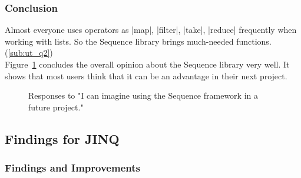 \subsubsection{Conclusion} %
\label{subsub:usertesting_conlusion}
Almost everyone uses operators as |map|, |filter|, |take|, |reduce|
frequently when working with lists. So the Sequence library brings much-needed
functions. (\ref{sub:ut_q2}) \\ 
Figure~\ref{fig:usertest_q1} concludes the overall opinion about the Sequence
library very well. It shows that most users think that it can be an
advantage in their next project.
\begin{figure}[H]
  \centering
{}
\caption{Responses to "I can imagine using the Sequence framework in a future project."}
\label{fig:usertest_q1}
\end{figure}
\subsection{Findings for JINQ} %
\label{sub:Findings for JINQ}
\subsubsection{Findings and Improvements} %
\label{subsub:jinq_finding_and_imrpovements}

